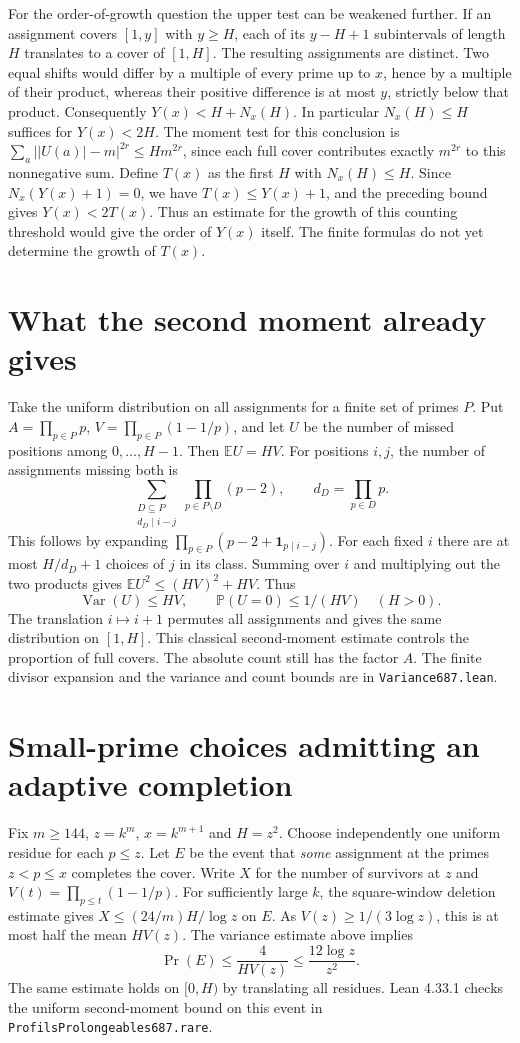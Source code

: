\documentclass[11pt]{article}
\begin{document}
For the order-of-growth question the upper test can be weakened further.
If an assignment covers $[1,y]$ with $y\ge H$, each of its $y-H+1$
subintervals of length $H$ translates to a cover of $[1,H]$. The resulting
assignments are distinct. Two equal shifts would differ by a multiple
of every prime up to $x$, hence by a multiple of their product, whereas
their positive difference is at most $y$, strictly below that product.
Consequently $Y(x)<H+N_x(H)$. In particular $N_x(H)\le H$ suffices for
$Y(x)<2H$. The moment test for this conclusion is
$\sum_a\bigl||U(a)|-m\bigr|^{2r}\le Hm^{2r}$, since each full cover
contributes exactly $m^{2r}$ to this nonnegative sum.
Define $T(x)$ as the first $H$ with $N_x(H)\le H$. Since
$N_x(Y(x)+1)=0$, we have $T(x)\le Y(x)+1$, and the preceding bound
gives $Y(x)<2T(x)$. Thus an estimate for the growth of this counting
threshold would give the order of $Y(x)$ itself. The finite formulas do
not yet determine the growth of $T(x)$.

\section*{What the second moment already gives}
Take the uniform distribution on all assignments for a finite set of
primes $P$. Put $A=\prod_{p\in P}p$, $V=\prod_{p\in P}(1-1/p)$, and
let $U$ be the number of missed positions among $0,\ldots,H-1$.
Then $\mathbb E U=HV$. For positions $i,j$, the number of assignments
missing both is
\[
 \sum_{\substack{D\subseteq P\\d_D\mid i-j}}
      \prod_{p\in P\setminus D}(p-2),\qquad d_D=\prod_{p\in D}p.
\]
This follows by expanding $\prod_{p\in P}(p-2+\mathbf1_{p\mid i-j})$.
For each fixed $i$ there are at most $H/d_D+1$ choices of $j$
in its class. Summing over $i$ and multiplying out the two products
gives $\mathbb E U^2\le (HV)^2+HV$. Thus
\[
       \operatorname{Var}(U)\le HV,\qquad
       \mathbb P(U=0)\le 1/(HV)\quad (H>0).
\]
The translation $i\mapsto i+1$ permutes all assignments and gives the
same distribution on $[1,H]$. This classical second-moment estimate
controls the proportion of full covers. The absolute count still has
the factor $A$. The finite divisor expansion and the variance and count
bounds are in \texttt{Variance687.lean}.

\section*{Small-prime choices admitting an adaptive completion}
Fix $m\ge144$, $z=k^m$, $x=k^{m+1}$ and $H=z^2$. Choose independently
one uniform residue for each $p\le z$. Let $E$ be the event that
\emph{some} assignment at the primes $z<p\le x$ completes the cover.
Write $X$ for the number of survivors at $z$ and
$V(t)=\prod_{p\le t}(1-1/p)$. For sufficiently large $k$,
the square-window deletion estimate gives $X\le(24/m)H/\log z$ on $E$.
As $V(z)\ge1/(3\log z)$, this is at most half the mean $HV(z)$.
The variance estimate above implies
\[
   \Pr(E)\le \frac{4}{HV(z)}\le\frac{12\log z}{z^2}.
\]
The same estimate holds on $[0,H)$ by translating all residues.
Lean 4.33.1 checks the uniform second-moment bound on this event in
\texttt{ProfilsProlongeables687.rare}.
\end{document}
